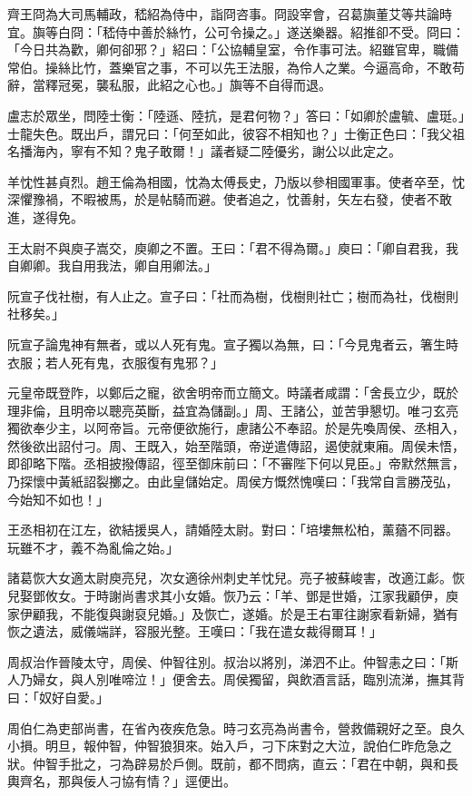 齊王冏為大司馬輔政，嵇紹為侍中，詣冏咨事。冏設宰會，召葛旟董艾等共論時宜。旟等白冏：「嵇侍中善於絲竹，公可令操之。」遂送樂器。紹推卻不受。冏曰：「今日共為歡，卿何卻邪？」紹曰：「公協輔皇室，令作事可法。紹雖官卑，職備常伯。操絲比竹，蓋樂官之事，不可以先王法服，為伶人之業。今逼高命，不敢苟辭，當釋冠冕，襲私服，此紹之心也。」旟等不自得而退。

盧志於眾坐，問陸士衡：「陸遜、陸抗，是君何物？」答曰：「如卿於盧毓、盧珽。」士龍失色。既出戶，謂兄曰：「何至如此，彼容不相知也？」士衡正色曰：「我父祖名播海內，寧有不知？鬼子敢爾！」議者疑二陸優劣，謝公以此定之。

羊忱性甚貞烈。趙王倫為相國，忱為太傅長史，乃版以參相國軍事。使者卒至，忱深懼豫禍，不暇被馬，於是帖騎而避。使者追之，忱善射，矢左右發，使者不敢進，遂得免。

王太尉不與庾子嵩交，庾卿之不置。王曰：「君不得為爾。」庾曰：「卿自君我，我自卿卿。我自用我法，卿自用卿法。」

阮宣子伐社樹，有人止之。宣子曰：「社而為樹，伐樹則社亡；樹而為社，伐樹則社移矣。」

阮宣子論鬼神有無者，或以人死有鬼。宣子獨以為無，曰：「今見鬼者云，箸生時衣服；若人死有鬼，衣服復有鬼邪？」

元皇帝既登阼，以鄭后之寵，欲舍明帝而立簡文。時議者咸謂：「舍長立少，既於理非倫，且明帝以聰亮英斷，益宜為儲副。」周、王諸公，並苦爭懇切。唯刁玄亮獨欲奉少主，以阿帝旨。元帝便欲施行，慮諸公不奉詔。於是先喚周侯、丞相入，然後欲出詔付刁。周、王既入，始至階頭，帝逆遣傳詔，遏使就東廂。周侯未悟，即卻略下階。丞相披撥傳詔，徑至御床前曰：「不審陛下何以見臣。」帝默然無言，乃探懷中黃紙詔裂擲之。由此皇儲始定。周侯方慨然愧嘆曰：「我常自言勝茂弘，今始知不如也！」

王丞相初在江左，欲結援吳人，請婚陸太尉。對曰：「培塿無松柏，薰蕕不同器。玩雖不才，義不為亂倫之始。」

諸葛恢大女適太尉庾亮兒，次女適徐州刺史羊忱兒。亮子被蘇峻害，改適江虨。恢兒娶鄧攸女。于時謝尚書求其小女婚。恢乃云：「羊、鄧是世婚，江家我顧伊，庾家伊顧我，不能復與謝裒兒婚。」及恢亡，遂婚。於是王右軍往謝家看新婦，猶有恢之遺法，威儀端詳，容服光整。王嘆曰：「我在遣女裁得爾耳！」

周叔治作晉陵太守，周侯、仲智往別。叔治以將別，涕泗不止。仲智恚之曰：「斯人乃婦女，與人別唯啼泣！」便舍去。周侯獨留，與飲酒言話，臨別流涕，撫其背曰：「奴好自愛。」

周伯仁為吏部尚書，在省內夜疾危急。時刁玄亮為尚書令，營救備親好之至。良久小損。明旦，報仲智，仲智狼狽來。始入戶，刁下床對之大泣，說伯仁昨危急之狀。仲智手批之，刁為辟易於戶側。既前，都不問病，直云：「君在中朝，與和長輿齊名，那與佞人刁協有情？」逕便出。

